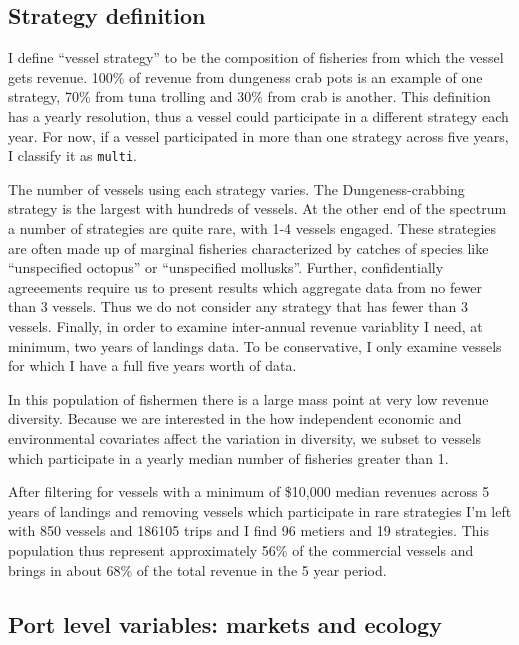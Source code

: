 \documentclass[]{article}
\begin{document}
\subsection{Strategy definition}\label{strategy-definition}

I define ``vessel strategy'' to be the composition of fisheries from
which the vessel gets revenue. 100\% of revenue from dungeness crab pots
is an example of one strategy, 70\% from tuna trolling and 30\% from
crab is another. This definition has a yearly resolution, thus a vessel
could participate in a different strategy each year. For now, if a
vessel participated in more than one strategy across five years, I
classify it as \texttt{multi}.

The number of vessels using each strategy varies. The Dungeness-crabbing
strategy is the largest with hundreds of vessels. At the other end of
the spectrum a number of strategies are quite rare, with 1-4 vessels
engaged. These strategies are often made up of marginal fisheries
characterized by catches of species like ``unspecified octopus'' or
``unspecified mollusks''. Further, confidentially agreeements require us
to present results which aggregate data from no fewer than 3 vessels.
Thus we do not consider any strategy that has fewer than 3 vessels.
Finally, in order to examine inter-annual revenue variablity I need, at
minimum, two years of landings data. To be conservative, I only examine
vessels for which I have a full five years worth of data.

In this population of fishermen there is a large mass point at very low
revenue diversity. Because we are interested in the how independent
economic and environmental covariates affect the variation in diversity,
we subset to vessels which participate in a yearly median number of
fisheries greater than 1.

After filtering for vessels with a minimum of \$10,000 median revenues
across 5 years of landings and removing vessels which participate in
rare strategies I'm left with 850 vessels and 186105 trips and I find 96
metiers and 19 strategies. This population thus represent approximately
56\% of the commercial vessels and brings in about 68\% of the total
revenue in the 5 year period.

\subsection{Port level variables: markets and
ecology}\label{port-level-variables-markets-and-ecology}
\end{document}
